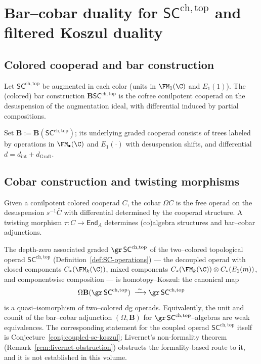 \section{Bar–cobar duality for $\mathsf{SC}^{\mathrm{ch,top}}$ and filtered Koszul duality}
\label{sec:bar-cobar}

\subsection{Colored cooperad and bar construction}
\label{subsec:bar}
Let $\mathsf{SC}^{\mathrm{ch,top}}$ be augmented in each color (units in $\FM_1(\C)$ and $E_1(1)$).
The (colored) bar construction $\mathbf B\mathsf{SC}^{\mathrm{ch,top}}$ is the cofree conilpotent cooperad on the desuspension of the augmentation ideal, with differential induced by partial compositions.

\begin{definition}
\label{def:bar}
Set $\mathbf B := \mathbf B(\mathsf{SC}^{\mathrm{ch,top}})$; its underlying graded cooperad consists of trees labeled by operations in $\FM_\bullet(\C)$ and $E_1(\cdot)$ with desuspension shifts, and differential $d=d_{\mathrm{int}}+d_{\mathrm{Graft}}$.
\end{definition}

\subsection{Cobar construction and twisting morphisms}
\label{subsec:cobar}
Given a conilpotent colored cooperad $C$, the cobar $\Omega C$ is the free operad on the desuspension $s^{-1}\bar{C}$ with differential determined by the cooperad structure.
A twisting morphism $\tau: C\to \mathsf{End}_A$ determines (co)algebra structures and bar–cobar adjunctions.

\begin{theorem}
\label{thm:homotopy-Koszul}
The depth-zero associated graded
$\gr\,\mathsf{SC}^{\mathrm{ch,top}}$ of the two--colored
topological operad $\mathsf{SC}^{\mathrm{ch,top}}$
(Definition~\textup{\ref{def:SC-operations}}) --- the decoupled
operad with closed components $C_\ast(\FM_k(\C))$, mixed components
$C_\ast(\FM_k(\C)) \otimes C_\ast(E_1(m))$, and componentwise
composition --- is homotopy--Koszul: the canonical map
\[
 \Omega\mathbf{B}(\gr\,\mathsf{SC}^{\mathrm{ch,top}})
 \;\xrightarrow{\;\sim\;}
 \gr\,\mathsf{SC}^{\mathrm{ch,top}}
\]
is a quasi--isomorphism of two--colored dg operads.
Equivalently, the unit and counit of the bar--cobar adjunction
$(\Omega,\mathbf B)$ for $\gr\,\mathsf{SC}^{\mathrm{ch,top}}$--algebras
are weak equivalences. The corresponding statement for the coupled
operad $\mathsf{SC}^{\mathrm{ch,top}}$ itself is
Conjecture~\ref{conj:coupled-sc-koszul}; Livernet's non-formality
theorem (Remark~\ref{rem:livernet-obstruction}) obstructs the
formality-based route to it, and it is not established in this
volume.
\end{theorem}


